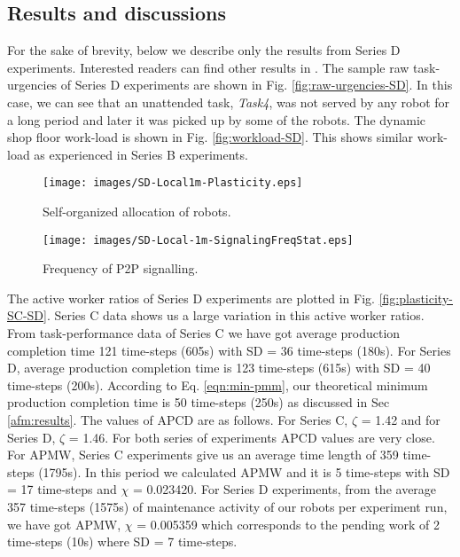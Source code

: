 \documentclass{intech}
\begin{document}
\subsection{Results and discussions}
For the sake of brevity, below we describe only the results from Series D experiments. Interested readers can find other results in \cite{Sarker2010thesis}. The sample raw task-urgencies of Series D experiments are shown in Fig. \ref{fig:raw-urgencies-SD}. In this case, we can see that an unattended task, \textit{Task4}, was not served by any robot for a long period and later it was picked up by some of the robots. 
The dynamic shop floor work-load is shown in Fig. \ref{fig:workload-SD}. This shows similar work-load as experienced in Series B experiments. 
%
\begin{figure}
\begin{minipage}[t]{0.48\linewidth}
\centering
\texttt{[image: images/SD-Local1m-Plasticity.eps]}
\caption{\small Self-organized allocation of robots.}
\label{fig:plasticity-SD} 
\end{minipage} 
\hspace{0.5cm}
\begin{minipage}[t]{0.48\linewidth}
\centering
\texttt{[image: images/SD-Local-1m-SignalingFreqStat.eps]}
\caption{\small Frequency of P2P signalling.}
\label{fig:local-signal-frequency-stat}
\end{minipage}
\end{figure}
The active worker ratios of Series D experiments are plotted in Fig. \ref{fig:plasticity-SC-SD}. Series C data shows us a large variation in this active worker ratios.
From task-performance data of Series C we have got average production completion time 121 time-steps (605s) with SD = 36 time-steps (180s). For Series D,  average production completion time is 123 time-steps (615s) with SD = 40 time-steps (200s). According to Eq. \ref{eqn:min-pmm}, our theoretical minimum production completion time is 50 time-steps (250s) as discussed in Sec \ref{afm:results}.  The values of APCD are as follows. For Series C, $\zeta$ = 1.42 and for Series D, $\zeta$ = 1.46. For both series of experiments APCD values are very close.\\
For APMW, Series C experiments give us an average time length of 359 time-steps (1795s). In this period we calculated APMW and it is 5 time-steps with SD = 17 time-steps and $\chi$ = 0.023420. For Series D experiments, from the average 357 time-steps (1575s) of maintenance activity of our robots per experiment run, we have got APMW, $\chi$ = 0.005359 which corresponds to the pending work of 2 time-steps (10s) where SD = 7 time-steps.
\end{document}
